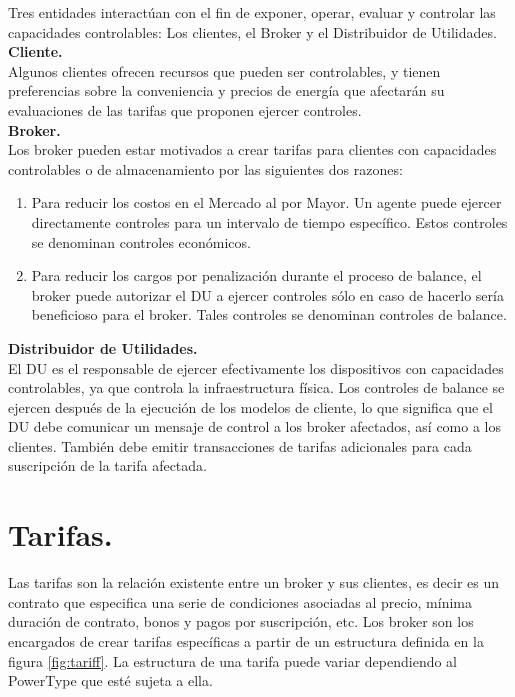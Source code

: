 Tres entidades interactúan con el fin de exponer, operar, evaluar y controlar las capacidades controlables: Los clientes, el Broker y el Distribuidor de Utilidades.\\

\textbf{Cliente.}\\

Algunos clientes ofrecen recursos que pueden ser controlables, y tienen preferencias sobre la conveniencia y precios de energía que afectarán su evaluaciones de las tarifas que proponen ejercer controles.\\

\textbf{Broker.}\\

Los broker pueden estar motivados a crear tarifas para clientes con capacidades controlables o de almacenamiento por las siguientes dos razones:

\begin{enumerate}
	\item Para reducir los costos en el Mercado al por Mayor. Un agente puede ejercer directamente controles para un intervalo de tiempo específico. Estos controles se denominan controles económicos.
	\item Para reducir los cargos por penalización durante el proceso de balance, el broker puede autorizar el DU a ejercer controles sólo en caso de hacerlo sería beneficioso para el broker. Tales controles se denominan controles de balance.
\end{enumerate}

\textbf{Distribuidor de Utilidades.}\\

El DU es el responsable de ejercer efectivamente los dispositivos con capacidades controlables, ya que controla la infraestructura física. Los controles de balance se ejercen después de la ejecución de los modelos de cliente, lo que significa que el DU debe comunicar un mensaje de control a los broker afectados, así como a los clientes. También debe emitir transacciones de tarifas adicionales para cada suscripción de la tarifa afectada.

\section{Tarifas.} \label{sec:tariff}
Las tarifas son la relación existente entre un broker y sus clientes, es decir es un contrato que especifica una serie de condiciones asociadas al precio, mínima duración de contrato, bonos y pagos por suscripción, etc. Los broker son los encargados de crear tarifas específicas a partir de un estructura definida  en la figura \ref{fig:tariff}. La estructura de una tarifa puede variar dependiendo al PowerType que esté sujeta a ella.

